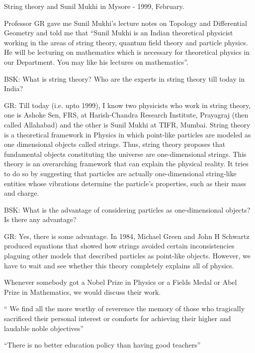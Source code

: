 String theory and Sunil Mukhi in Mysore - 1999, February.

Professor GR gave me Sunil Mukhi’s lecture notes on Topology and Differential Geometry and told me that “Sunil Mukhi is an Indian theoretical physicist working in the areas of string theory, quantum field theory and particle physics. He will be lecturing on mathematics which is necessary for theoretical physics in our Department. You may like his lectures on mathematics”.

BSK: What is string theory? Who are the experts in string theory till today in India?

GR: Till today (i.e. upto 1999), I know two physicists who work in string theory, one is Ashoke Sen, FRS, at Harish-Chandra Research Institute, Prayagraj (then called Allahabad) and the other is Sunil Mukhi at TIFR, Mumbai. String theory is a theoretical framework in Physics in which point-like particles are modeled as one dimensional objects called strings. Thus, string theory proposes that fundamental objects constituting the universe are one-dimensional strings. This theory is an overarching framework that can explain the physical reality. It tries to do so by suggesting that particles are actually one-dimensional string-like entities whose vibrations determine the particle’s properties, such as their mass and charge.

BSK: What is the advantage of considering particles as one-dimensional objects? Is there any advantage?

GR: Yes, there is some advantage. In 1984, Michael Green and John H Schwartz produced equations that showed how strings avoided certain inconsistencies plaguing other models that described particles as point-like objects. However, we have to wait and see whether this theory completely explains all of physics.

Whenever somebody got a Nobel Prize in Physics or a Fields Medal or Abel Prize in Mathematics, we would discuss their work.

“ We find all the more worthy of reverence the memory of those who tragically sacrificed their personal interest or comforts for achieving their higher and laudable noble objectives”

“There is no better education policy than having good teachers”




